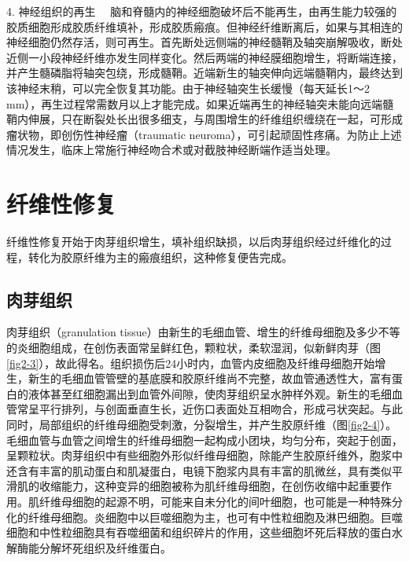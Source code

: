 {4. 神经组织的再生}
　脑和脊髓内的神经细胞破坏后不能再生，由再生能力较强的胶质细胞形成胶质纤维填补，形成胶质瘢痕。但神经纤维断离后，如果与其相连的神经细胞仍然存活，则可再生。首先断处远侧端的神经髓鞘及轴突崩解吸收，断处近侧一小段神经纤维亦发生同样变化。然后两端的神经膜细胞增生，将断端连接，并产生髓磷脂将轴突包绕，形成髓鞘。近端新生的轴突伸向远端髓鞘内，最终达到该神经末稍，可以完全恢复其功能。由于神经轴突生长缓慢（每天延长1～2
mm），再生过程常需数月以上才能完成。如果近端再生的神经轴突未能向远端髓鞘内伸展，只在断裂处长出很多细支，与周围增生的纤维组织缠绕在一起，可形成瘤状物，即创伤性神经瘤（traumatic
neuroma），可引起顽固性疼痛。为防止上述情况发生，临床上常施行神经吻合术或对截肢神经断端作适当处理。

\section{纤维性修复}

纤维性修复开始于肉芽组织增生，填补组织缺损，以后肉芽组织经过纤维化的过程，转化为胶原纤维为主的瘢痕组织，这种修复便告完成。

\subsection{肉芽组织}

肉芽组织（granulation
tissue）由新生的毛细血管、增生的纤维母细胞及多少不等的炎细胞组成，在创伤表面常呈鲜红色，颗粒状，柔软湿润，似新鲜肉芽（图\ref{fig2-3}），故此得名。组织损伤后24小时内，血管内皮细胞及纤维母细胞开始增生，新生的毛细血管管壁的基底膜和胶原纤维尚不完整，故血管通透性大，富有蛋白的液体甚至红细胞漏出到血管外间隙，使肉芽组织呈水肿样外观。新生的毛细血管常呈平行排列，与创面垂直生长，近伤口表面处互相吻合，形成弓状突起。与此同时，局部组织的纤维母细胞受刺激，分裂增生，并产生胶原纤维（图\ref{fig2-4}）。毛细血管与血管之间增生的纤维母细胞一起构成小团块，均匀分布，突起于创面，呈颗粒状。肉芽组织中有些细胞外形似纤维母细胞，除能产生胶原纤维外，胞浆中还含有丰富的肌动蛋白和肌凝蛋白，电镜下胞浆内具有丰富的肌微丝，具有类似平滑肌的收缩能力，这种变异的细胞被称为肌纤维母细胞，在创伤收缩中起重要作用。肌纤维母细胞的起源不明，可能来自未分化的间叶细胞，也可能是一种特殊分化的纤维母细胞。炎细胞中以巨噬细胞为主，也可有中性粒细胞及淋巴细胞。巨噬细胞和中性粒细胞具有吞噬细菌和组织碎片的作用，这些细胞坏死后释放的蛋白水解酶能分解坏死组织及纤维蛋白。

